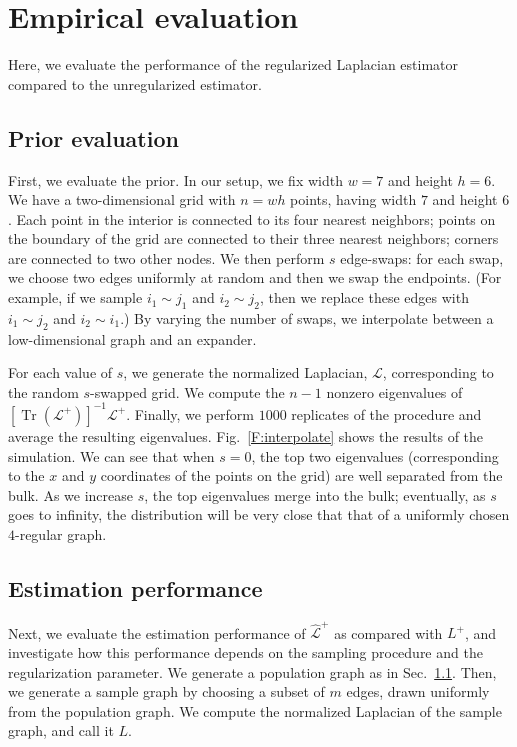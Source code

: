 \documentclass[12pt]{article}
\DeclareMathOperator*{\Tr}{Tr}
\theoremstyle{plain}
\begin{document}
\section{Empirical evaluation}
\label{sxn:empirical}

Here, we evaluate the performance of the regularized Laplacian
estimator compared to the unregularized estimator.

\subsection{Prior evaluation}\label{S:prior-evaluation}

First, we evaluate the prior.  In our setup, we fix width $w = 7$ and
height $h = 6$.  We have a two-dimensional grid with $n = w h$ points,
having width $7$ and height $6$.  Each point in the
interior is connected to its four nearest neighbors; points on the
boundary of the grid are connected to their three nearest neighbors;
corners are connected to two other nodes.  We then perform
$s$ edge-swaps: for each swap, we choose two edges
uniformly at random and then we swap the endpoints.  (For example, if
we sample $i_1 \sim j_1$ and $i_2 \sim j_2$, then we replace these
edges with $i_1 \sim j_2$ and $i_2 \sim i_1$.)  By varying the number
of swaps, we interpolate between a low-dimensional graph and an expander.

For each value of $s$, we generate the normalized Laplacian, $\mathcal{L}$,
corresponding to the random $s$-swapped grid.  We compute the $n-1$ nonzero
eigenvalues of $[\Tr(\mathcal{L}^{+})]^{-1} \mathcal{L}^{+}$.
Finally, we perform $1000$ replicates of the procedure and average the
resulting eigenvalues.  Fig.~\ref{F:interpolate} shows the results of
the simulation.  We can see that when $s = 0$, the top two eigenvalues
(corresponding to the $x$ and $y$ coordinates of the points on the grid)
are well separated from the bulk.  As we increase $s$, the top eigenvalues
merge into the bulk; eventually, as $s$ goes to infinity, the
distribution will be very close that that of a uniformly chosen
$4$-regular graph.


\subsection{Estimation performance}

Next, we evaluate the estimation performance of $\mathcal{\hat L}^{+}$
as compared with $L^+$, and investigate how this performance depends
on the sampling procedure and the regularization parameter.  We
generate a population graph as in Sec.~\ref{S:prior-evaluation}.
Then, we generate a sample graph by choosing a subset of $m$ edges,
drawn uniformly from the population graph.  We compute the normalized
Laplacian of the sample graph, and call it $L$.
\end{document}
